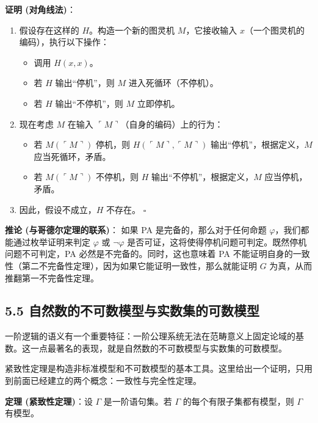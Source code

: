 \documentclass[12pt, a4paper]{article}
\begin{document}
\textbf{证明 (对角线法)}：
\begin{enumerate}
    \item 假设存在这样的 \(H\)。构造一个新的图灵机 \(M\)，它接收输入 \(x\)（一个图灵机的编码），执行以下操作：
    \begin{itemize}
        \item 调用 \(H(x, x)\)。
        \item 若 \(H\) 输出“停机”，则 \(M\) 进入死循环（不停机）。
        \item 若 \(H\) 输出“不停机”，则 \(M\) 立即停机。
    \end{itemize}
    \item 现在考虑 \(M\) 在输入 \(\ulcorner M \urcorner\)（自身的编码）上的行为：
    \begin{itemize}
        \item 若 \(M(\ulcorner M \urcorner)\) 停机，则 \(H(\ulcorner M \urcorner, \ulcorner M \urcorner)\) 输出“停机”，根据定义，\(M\) 应当死循环，矛盾。
        \item 若 \(M(\ulcorner M \urcorner)\) 不停机，则 \(H\) 输出“不停机”，根据定义，\(M\) 应当停机，矛盾。
    \end{itemize}
    \item 因此，假设不成立，\(H\) 不存在。 \hfill \(\square\)
\end{enumerate}

\textbf{推论 (与哥德尔定理的联系)}：
如果 PA 是完备的，那么对于任何命题 \(\varphi\)，我们都能通过枚举证明来判定 \(\varphi\) 或 \(\neg \varphi\) 是否可证，这将使得停机问题可判定。既然停机问题不可判定，PA 必然是不完备的。同时，这也意味着 PA 不能证明自身的一致性（第二不完备性定理），因为如果它能证明一致性，那么就能证明 \(G\) 为真，从而推翻第一不完备性定理。

\subsection*{5.5 自然数的不可数模型与实数集的可数模型}

一阶逻辑的语义有一个重要特征：一阶公理系统无法在范畴意义上固定论域的基数。这一点最著名的表现，就是自然数的不可数模型与实数集的可数模型。

紧致性定理是构造非标准模型和不可数模型的基本工具。这里给出一个证明，只用到前面已经建立的两个概念：一致性与完全性定理。

\begin{mdframed}
\textbf{定理 (紧致性定理)}：设 \(\Gamma\) 是一阶语句集。若 \(\Gamma\) 的每个有限子集都有模型，则 \(\Gamma\) 有模型。
\end{mdframed}
\end{document}
